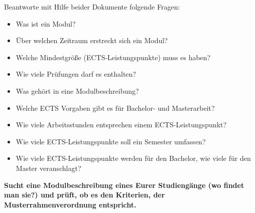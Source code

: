 \documentclass{scrartcl}
\begin{document}
Beantworte mit Hilfe beider Dokumente folgende Fragen:
\begin{itemize}
	\item Was ist ein Modul?
	\item Über welchen Zeitraum erstreckt sich ein Modul?
	\item Welche Mindestgröße (ECTS-Leistungspunkte) muss es haben?
	\item Wie viele Prüfungen darf es enthalten?
	\item Was gehört in eine Modulbeschreibung?
	\item Welche ECTS Vorgaben gibt es für Bachelor- und Masterarbeit?
	\item Wie viele Arbeitsstunden entsprechen einem ECTS-Leistungspunkt?
	\item Wie viele ECTS-Leistungspunkte soll ein Semester umfassen?
	\item Wie viele ECTS-Leistungspunkte werden für den Bachelor, wie viele für den Master veranschlagt?
	\end{itemize}
	
\textbf{Sucht eine Modulbeschreibung eines Eurer Studiengänge (wo findet man sie?) und prüft, ob es den Kriterien, der Musterrahmenverordnung entspricht.}
\end{document}

